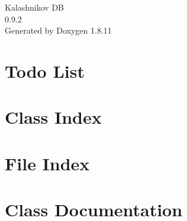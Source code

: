\documentclass[twoside]{book}
\newcommand{\+}{\discretionary{\mbox{\scriptsize$\hookleftarrow$}}{}{}}
\newcommand{\clearemptydoublepage}{%
  \newpage{\pagestyle{empty}\cleardoublepage}%
}
\begin{document}
\hypersetup{pageanchor=false,
             bookmarksnumbered=true,
             pdfencoding=unicode
            }
\begin{titlepage}
\vspace*{7cm}
\begin{center}%
{\Large Kalashnikov DB \\[1ex]\large 0.\+9.\+2 }\\
\vspace*{1cm}
{\large Generated by Doxygen 1.8.11}\\
\end{center}
\end{titlepage}
\clearemptydoublepage
\tableofcontents
\clearemptydoublepage
{}
\hypersetup{pageanchor=true}

\chapter{Todo List}
\label{todo}
\hypertarget{todo}{}

\chapter{Class Index}

\chapter{File Index}

\chapter{Class Documentation}













































\end{document}
